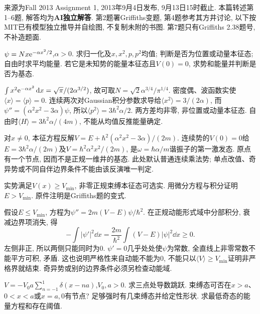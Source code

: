 来源为Fall 2013 Assignment 1, 2013年9月4日发布, 9月13日15时截止. 本篇转述第1--6题, 解答均为\textbf{AI独立解答}. 第2题署Griffiths变题, 第4题参考其方井讨论, 以下按MIT已有模型独立推导并自绘图, 不复制未附的书图. 第7题只有Griffiths 2.38题号, 不补造题面.
\begin{exercise}
$\psi=Nx\mathrm e^{-\alpha x^2/2}$,$\alpha>0$. 求归一化及$x,x^2,p,p^2$均值; 判断是否为位置或动量本征态; 自由时求平均能量. 若它是未知势的能量本征态且$V(0)=0$, 求势和能量并判断是否为基态.
\end{exercise}
\begin{solution}
$\int x^2\mathrm e^{-\alpha x^2}\,\mathrm d x=\sqrt\pi/(2\alpha^{3/2})$, 故可取$N=\sqrt2\alpha^{3/4}/\pi^{1/4}$. 密度偶、波函数实使$\langle x\rangle=\langle p\rangle=0$. 连续两次对Gaussian积分参数求导给$\langle x^2\rangle=3/(2\alpha)$, 而$\psi''=(\alpha^2x^2-3\alpha)\psi$, 所以$\langle p^2\rangle=3\hbar^2\alpha/2$. 两方差均非零, 非位置或动量本征态. 自由时$\langle H\rangle=3\hbar^2\alpha/(4m)$, 不能从均值反推能量确定.

对$x\ne0$, 本征方程反解$V=E+\hbar^2(\alpha^2x^2-3\alpha)/(2m)$. 连续势的$V(0)=0$给$E=3\hbar^2\alpha/(2m)$及$V=\hbar^2\alpha^2x^2/(2m)$, 是$\omega=\hbar\alpha/m$谐振子的第一激发态. 原点有一个节点, 因而不是正规一维井的基态. 此处默认普通连续乘法势; 单点改值、奇异势或不同自伴边界条件不能由该反演唯一判定.
\end{solution}
\begin{exercise}
实势满足$V(x)\ge V_{\min}$, 非零正规束缚本征态可选实. 用微分方程与积分证明$E>V_{\min}$. 原件注明是Griffiths题的变式.
\end{exercise}
\begin{solution}
假设$E\le V_{\min}$, 方程为$\psi''=2m(V-E)\psi/\hbar^2$. 在正规动能形式域中分部积分, 衰减边界项消失, 得
\[
-\int|\psi'|^2\dd x=\frac{2m}{\hbar^2}\int(V-E)|\psi|^2\dd x\ge0.
\]
左侧非正, 所以两侧只能同时为0. $\psi'=0$几乎处处使$\psi$为常数, 全直线上非零常数不能平方可积, 矛盾. 这也说明严格性来自动能不能为0, 不能只以$\langle V\rangle\ge V_{\min}$证明非严格界就结束. 奇异势或别的边界条件必须另检查动能域.
\end{solution}
\begin{exercise}
$V=-V_0a\sum_{n=-1}^{1}\delta(x-na)$,$V_0,a>0$. 求三点处导数跳跃. 束缚态可否在$x>a$、$0<x<a$或$x=a,0$有节点? 足够强时有几束缚态并给定性形状. 求最低奇态的能量方程和存在阈值.
\end{exercise}

